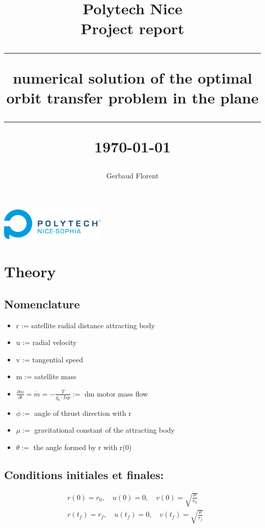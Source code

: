 \documentclass{article}
\title{\textbf{\Huge Polytech Nice}\\[1cm]
	\textbf{\LARGE Project report}\\[2cm]
	\hrule height 1pt
	\vspace{0.5cm}
	\textbf{\Large numerical solution of the optimal orbit transfer problem in the 
		plane}\\[0.5cm]
	\hrule height 1pt
	\vspace{3cm}
	\small{\today}}
\author{
	\begin{tabular}{c}
		Gerbaud Florent \\
	\end{tabular}
}
\date{}
\begin{document}
	\maketitle
	\vspace{3cm}
	\begin{center}
		\includegraphics[width=5cm]{Polytech.png}
	\end{center}
	\newpage %
	\renewcommand{\contentsname}{
		\hfill
		\begin{tikzpicture}
			\node[draw, fill=white, inner sep=20pt,line width=1.5pt] {\fontsize{30}{36}\selectfont\bfseries Table des matières};
		\end{tikzpicture}
		\hfill
	}
	\tableofcontents
	\listofalgorithms
	\newpage
	
	\section{Theory}
	
	\subsection{Nomenclature}
		\begin{itemize}
			\item r := satellite radial distance attracting body
			\item u := radial velocity
			\item v := tangential speed
			\item m := satellite mass
			\item $\frac{\partial m}{\partial t} = \dot{m} = -\frac{T}{g_0 \cdot Isp} := $  dm motor mass flow
			\item $\phi := $ angle of thrust direction with r
			\item $\mu := $  gravitational constant of the attracting body
			\item $\theta := $ the angle formed by r with r(0)
		\end{itemize}
		
		\subsection{Conditions initiales et finales:}
		\[ \boxed{\begin{aligned}
				& r(0)=r_0, \quad u(0)=0, \quad v(0)=\sqrt{\frac{\mu}{r_0}} \\
				& r\left(t_f\right)=r_f, \quad u\left(t_f\right)=0, \quad v\left(t_f\right)=\sqrt{\frac{\mu}{r_f}}
		\end{aligned}} \]
	 
\end{document}
